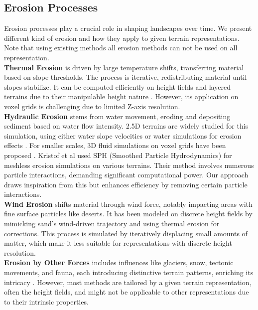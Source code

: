 \subsection{Erosion Processes}
Erosion processes play a crucial role in shaping landscapes over time. We present different kind of erosion and how they apply to given terrain representations. Note that using existing methods all erosion methods can not be used on all representation.\\
\textbf{Thermal Erosion} is driven by large temperature shifts, transferring material based on slope thresholds. The process is iterative, redistributing material until slopes stabilize. It can be computed efficiently on height fields and layered terrains due to their manipulable height nature \cite{Musgrave1989, Benes2001, Peytavie2009}. However, its application on voxel grids is challenging due to limited Z-axis resolution.\\
\textbf{Hydraulic Erosion} stems from water movement, eroding and depositing sediment based on water flow intensity. 2.5D terrains are widely studied for this simulation, using either water slope velocities \cite{Neidhold2005} or water simulations for erosion effects \cite{Mei2007}. For smaller scales, 3D fluid simulations on voxel grids have been proposed \cite{Benes2006}. Kristof et al \cite{Kristof2009} used SPH (Smoothed Particle Hydrodynamics) for meshless erosion simulations on various terrains. Their method involves numerous particle interactions, demanding significant computational power. Our approach draws inspiration from this but enhances efficiency by removing certain particle interactions.\\
\textbf{Wind Erosion} shifts material through wind force, notably impacting areas with fine surface particles like deserts. It has been modeled on discrete height fields \cite{Roa2004, Paris2020} by mimicking sand's wind-driven trajectory and using thermal erosion for corrections. This process is simulated by iteratively displacing small amounts of matter, which make it less suitable for representations with discrete height resolution.\\
\textbf{Erosion by Other Forces} includes influences like glaciers, snow, tectonic movements, and fauna, each introducing distinctive terrain patterns, enriching its intricacy \cite{Cordonnier2016,Cordonnier2017a,Cordonnier2018,Cordonnier2017b,Argudo2020}. However, most methods are tailored by a given terrain representation, often the height fields, and might not be applicable to other representations due to their intrinsic properties.
